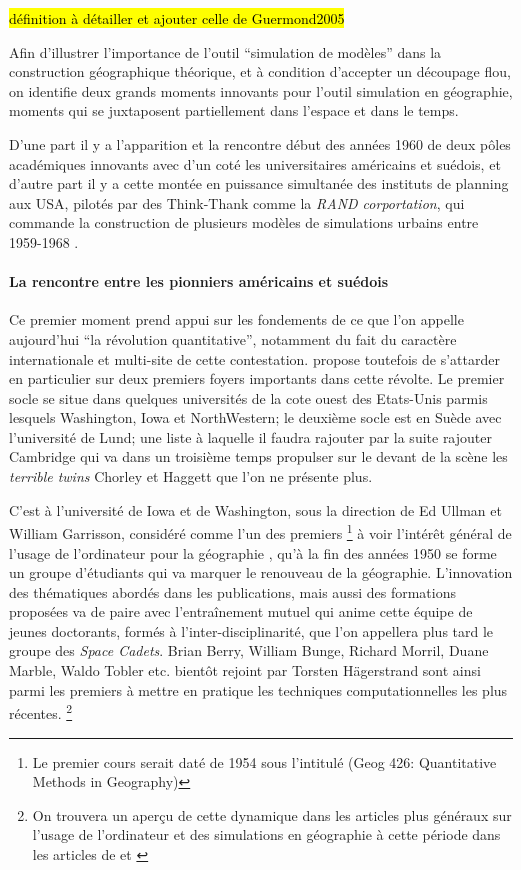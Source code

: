 \hl{définition à détailler et ajouter celle de Guermond2005}


Afin d'illustrer l'importance de l'outil \enquote{simulation de modèles} dans la construction géographique théorique, et à condition d'accepter un découpage flou, on identifie deux grands moments innovants pour l'outil simulation en géographie, moments qui se juxtaposent partiellement dans l'espace et dans le temps.

D'une part il y a l'apparition et la rencontre début des années 1960 de deux pôles académiques innovants avec d'un coté les universitaires américains et suédois, et d'autre part il y a cette montée en puissance simultanée des instituts de planning aux USA, pilotés par des Think-Thank comme la \textit{RAND corportation}, qui commande la construction de plusieurs modèles de simulations urbains entre 1959-1968 \autocite[307]{Batty1976}. 

\paragraph{La rencontre entre les pionniers américains et suédois}

Ce premier moment prend appui sur les fondements de ce que l'on appelle aujourd'hui \enquote{la révolution quantitative}, notamment du fait du caractère internationale et multi-site de cette contestation. \textcite{Gould2004} propose toutefois de s'attarder en particulier sur deux premiers foyers importants dans cette révolte. Le premier socle se situe dans quelques universités de la cote ouest des Etats-Unis \autocite{Gould2004} parmis lesquels Washington, Iowa et NorthWestern; le deuxième socle est en Suède avec l'université de Lund; une liste à laquelle il faudra rajouter par la suite rajouter Cambridge qui va dans un troisième temps propulser sur le devant de la scène les \textit{terrible twins} Chorley et Haggett que l'on ne présente plus.

C'est à l'université de Iowa et de Washington, sous la direction de Ed Ullman et William Garrisson, considéré comme l'un des premiers \footnote {Le premier cours serait daté de 1954 sous l'intitulé (Geog 426: Quantitative Methods in Geography) } à voir l'intérêt général de l'usage de l'ordinateur pour la géographie , qu'à la fin des années 1950 se forme un groupe d'étudiants qui va marquer le renouveau de la géographie. L'innovation des thématiques abordés dans les publications, mais aussi des formations proposées va de paire avec l’entraînement mutuel qui anime cette équipe de jeunes doctorants, formés à l'inter-disciplinarité, que l'on appellera plus tard le groupe des \textit{Space Cadets}. Brian Berry, William Bunge, Richard Morril, Duane Marble, Waldo Tobler etc. bientôt rejoint par Torsten Hägerstrand sont ainsi parmi les premiers à mettre en pratique les techniques computationnelles les plus récentes. \footnote{ On trouvera un aperçu de cette dynamique dans les articles plus généraux sur l'usage de l'ordinateur et des simulations en géographie à cette période dans les articles de \textcite{Haggett1969} et \textcite{Marble1972}}

